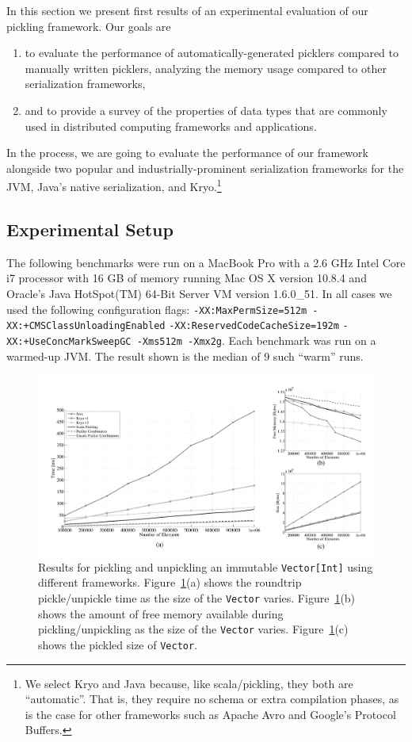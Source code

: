 \documentclass[10pt]{sigplanconf}
\theoremstyle{definition}
\theoremstyle{definition}
\begin{document}
In this section we present first results of an experimental evaluation
of our pickling framework. Our goals are
\begin{enumerate}
\item to evaluate the performance of automatically-generated picklers
  compared to manually written picklers, analyzing the memory usage
  compared to other serialization frameworks,
\item and to provide a survey of the properties of data types that are
  commonly used in distributed computing frameworks and applications.
\end{enumerate}\noindent
In the process, we are going to evaluate the performance of our
framework alongside two popular and industrially-prominent serialization frameworks
for the JVM, Java's native serialization, and Kryo.\footnote{We select Kryo and Java because, like scala/pickling, they both are ``automatic''. That is, they require no schema or extra compilation phases, as is the case for other frameworks such as Apache Avro and Google's Protocol Buffers.}

\subsection{Experimental Setup}

The following benchmarks were run on a MacBook Pro with a 2.6 GHz
Intel Core i7 processor with 16 GB of memory running Mac OS X version
10.8.4 and Oracle's Java HotSpot(TM) 64-Bit Server VM version
1.6.0\_51. In all cases we used the following configuration flags:
\texttt{-XX:MaxPermSize=512m -XX:+CMSClassUnloadingEnabled}
\linebreak
\texttt{-XX:ReservedCodeCacheSize=192m}
\texttt{-XX:+UseConcMarkSweepGC  -Xms512m -Xmx2g}.
Each benchmark was run on a warmed-up JVM. The result shown is the median of 9 such
``warm'' runs.

\begin{figure}[ht!]
 \centering
 \includegraphics[width=\textwidth]{travInt-all.pdf}
 \caption{Results for pickling and unpickling an immutable
   \texttt{Vector[Int]} using different frameworks. Figure~\ref{fig:results-vector}(a) shows the roundtrip pickle/unpickle time as the size of the \texttt{Vector} varies. Figure~\ref{fig:results-vector}(b) shows the amount of free memory available during pickling/unpickling as the size of the \texttt{Vector} varies. Figure~\ref{fig:results-vector}(c) shows the pickled size of \texttt{Vector}.}
 \label{fig:results-vector}
\end{figure}
\end{document}
